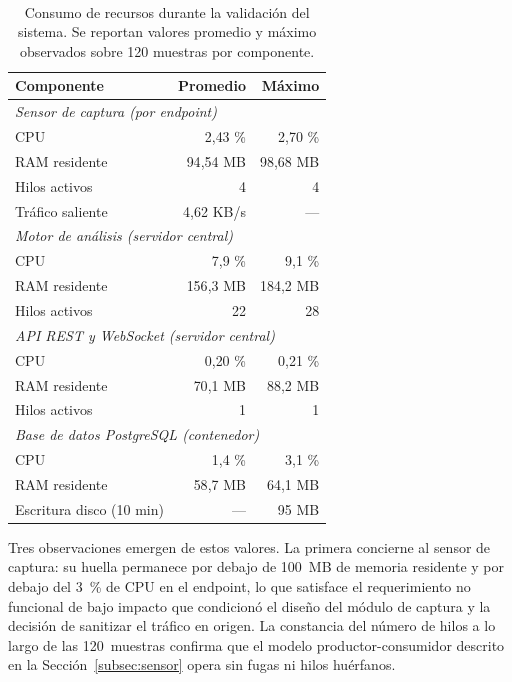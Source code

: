 \begin{table}[ht]
\centering
\caption{Consumo de recursos durante la validación del sistema. Se reportan valores promedio y máximo observados sobre 120 muestras por componente.}
~\label{tab:rendimiento}
\small
\begin{tabular}{@{}lrr@{}}
\toprule
\textbf{Componente} & \textbf{Promedio} & \textbf{Máximo} \\
\midrule
\multicolumn{3}{l}{\textit{Sensor de captura (por endpoint)}} \\
\quad CPU            & 2{,}43 \% & 2{,}70 \% \\
\quad RAM residente  & 94{,}54 MB & 98{,}68 MB \\
\quad Hilos activos  & 4 & 4 \\
\quad Tráfico saliente & 4{,}62 KB/s & --- \\
\midrule
\multicolumn{3}{l}{\textit{Motor de análisis (servidor central)}} \\
\quad CPU            & 7{,}9 \% & 9{,}1 \% \\
\quad RAM residente  & 156{,}3 MB & 184{,}2 MB \\
\quad Hilos activos  & 22 & 28 \\
\midrule
\multicolumn{3}{l}{\textit{API REST y WebSocket (servidor central)}} \\
\quad CPU            & 0{,}20 \% & 0{,}21 \% \\
\quad RAM residente  & 70{,}1 MB & 88{,}2 MB \\
\quad Hilos activos  & 1 & 1 \\
\midrule
\multicolumn{3}{l}{\textit{Base de datos PostgreSQL (contenedor)}} \\
\quad CPU            & 1{,}4 \% & 3{,}1 \% \\
\quad RAM residente  & 58{,}7 MB & 64{,}1 MB \\
\quad Escritura disco (10 min) & --- & 95 MB \\
\bottomrule
\end{tabular}
\end{table}

Tres observaciones emergen de estos valores. La primera concierne 
al sensor de captura: su huella permanece por debajo de 100~MB de 
memoria residente y por debajo del 3~\% de CPU en el endpoint, lo 
que satisface el requerimiento no funcional de bajo impacto que 
condicionó el diseño del módulo de captura y la decisión de 
sanitizar el tráfico en origen. La constancia del número de hilos 
a lo largo de las 120~muestras confirma que el modelo 
productor-consumidor descrito en la Sección~\ref{subsec:sensor} 
opera sin fugas ni hilos huérfanos.

